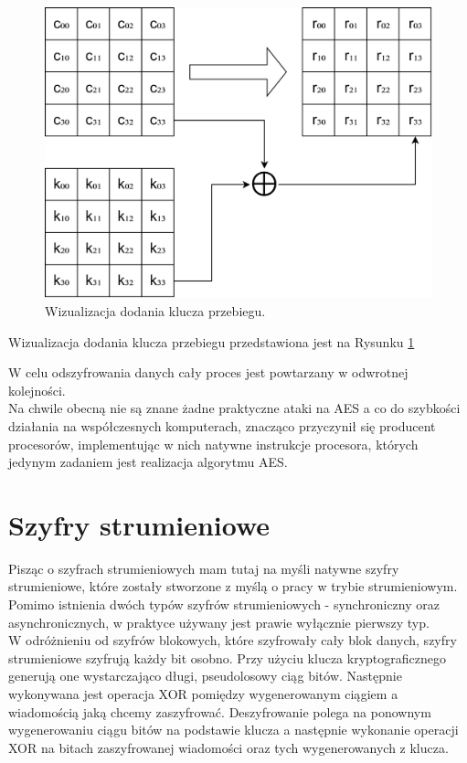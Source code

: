 \begin{enumerate}
\begin{figure}[t]
			    \includegraphics[width=\textwidth]{content/images/add-key}
				\caption{Wizualizacja dodania klucza przebiegu.}
				\label{kk}
			\end{figure}
			Wizualizacja dodania klucza przebiegu przedstawiona jest na Rysunku \ref{kk}
\end{enumerate}
W celu odszyfrowania danych cały proces jest powtarzany w odwrotnej kolejności. \\
Na chwile obecną nie są znane żadne praktyczne ataki na AES a co do szybkości działania na współczesnych komputerach,
znacząco przyczynił się producent procesorów, implementując w nich natywne instrukcje procesora, których 
jedynym zadaniem jest realizacja algorytmu AES.

\section{Szyfry strumieniowe}
Pisząc o szyfrach strumieniowych mam tutaj na myśli natywne szyfry strumieniowe, które zostały stworzone z myślą o pracy w trybie strumieniowym. 
Pomimo istnienia dwóch typów szyfrów strumieniowych - synchroniczny oraz asynchronicznych, w praktyce używany jest prawie wyłącznie pierwszy typ. \\
W odróżnieniu od szyfrów blokowych, które szyfrowały cały blok danych, szyfry strumieniowe szyfrują każdy bit osobno. 
Przy użyciu klucza kryptograficznego generują one wystarczająco długi, pseudolosowy ciąg bitów. 
Następnie wykonywana jest operacja XOR pomiędzy wygenerowanym ciągiem a wiadomością jaką chcemy zaszyfrować. 
Deszyfrowanie polega na ponownym wygenerowaniu ciągu bitów na podstawie klucza a następnie wykonanie operacji XOR na bitach zaszyfrowanej wiadomości oraz tych wygenerowanych z klucza.

